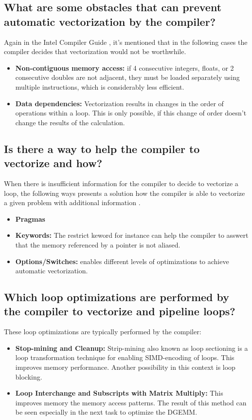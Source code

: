 \documentclass[unicode,11pt,a4paper,oneside,numbers=endperiod,openany]{scrartcl}
\begin{document}
\subsection{What are some obstacles that can prevent automatic vectorization by the compiler?}
Again in the Intel Compiler Guide \cite{autovectorization}, it's mentioned that in the following cases the compiler decides that 
vectorization would not be worthwhile.
\begin{itemize}
    \item {\textbf{Non-contiguous memory access:} if 4 consecutive integers, floats, or 2 consecutive doubles are not adjacent, 
    they must be loaded separately using multiple instructions, which is considerably less efficient.}
    \item {\textbf{Data dependencies:} Vectorization results in changes in the order of operations within a loop. This is only possible, 
    if this change of order doesn't change the results of the calculation.}
\end{itemize}

\subsection{Is there a way to help the compiler to vectorize and how?}
When there is insufficient information for the compiler to decide to vectorize a loop, the following ways presents a solution 
how the compiler is able to vectorize a given problem with additional information \cite{autovectorization}.
\begin{itemize}
    \item {\textbf{Pragmas}}
    \item {\textbf{Keywords:} The restrict keword for instance can help the compiler to asswert that the memory referenced by a pointer 
    is not aliased.}
    \item {\textbf{Options/Switches:} enables different levels of optimizations to achieve automatic vectorization.}
\end{itemize}

\subsection{Which loop optimizations are performed by the compiler to vectorize and pipeline loops?}
These loop optimizations are typically performed by the compiler:
\begin{itemize}
    \item {\textbf{Stop-mining and Cleanup:} Strip-mining also known as loop sectioning is a loop transformation technique for enabling SIMD-encoding 
    of loops. This improves memory performance. Another possibility in this context is loop blocking.}
    \item {\textbf{Loop Interchange and Subscripts with Matrix Multiply:} This improves memory the memory access patterns. The result of this method can be 
    seen especially in the next task to optimize the DGEMM.}
\end{itemize}
\end{document}
